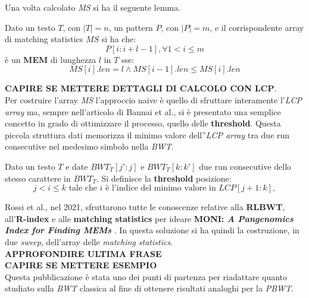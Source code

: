 Una volta calcolato \textit{MS} si ha il seguente lemma.
\begin{lemma}
  Dato un testo $T$, con $|T|=n$, un pattern $P$, con $|P|=m$, e il
  corrispondente array di matching statistics $MS$ si ha che:
  \[P[i:i+l-1],\forall 1<i\leq m\]
  è un \textbf{MEM} di lunghezza $l$ in $T$ sse:
  \[MS[i].len=l\land MS[i-1].len\leq MS[i].len\]
\end{lemma}
\textbf{CAPIRE SE METTERE DETTAGLI DI CALCOLO CON LCP}.\\
Per costruire l'array \textit{MS} l'approccio naive è quello di sfruttare
interamente l'\textit{LCP array} ma, sempre nell'articolo di Bannai et
al.\cite{bannai}, si è presentato una semplice concetto in grado di
ottimizzare il processo, quello delle \textbf{threshold}. Questa piccola
struttura dati memorizza il minimo valore dell''\textit{LCP array} tra due run
consecutive nel medesimo simbolo nella \textit{BWT}.
\begin{definizione}
  Dato un testo $T$ e date $BWT_T[j':j]$ e $BWT_T[k:k']$ due run consecutive
  dello stesso carattere in $BWT_T$. Si definisce la \textbf{threshold}
  posizione:
  \[j< i \leq k\mbox{ tale che } i\mbox{ è l'indice del minimo valore in
    }LCP[j+1:k],\] 
\end{definizione}
Rossi et al., nel 2021, sfruttarono tutte le conoscenze relative
alla \textbf{RLBWT}, all'\textbf{R-index} e alle \textbf{matching statistics}
per ideare \textbf{MONI:\textit{ A Pangenomics Index for Finding MEMs}}
\cite{moni}. In questa soluzione si ha quindi la costruzione, in due
\textit{sweep}, dell'array delle \textit{matching statistics}.\\
\textbf{APPROFONDIRE ULTIMA FRASE}\\
\textbf{CAPIRE SE METTERE ESEMPIO}\\
Questa pubblicazione è stata uno dei punti di partenza per
riadattare quanto studiato sulla \textit{BWT} classica al fine di ottenere
risultati analoghi per la \textit{PBWT}.
